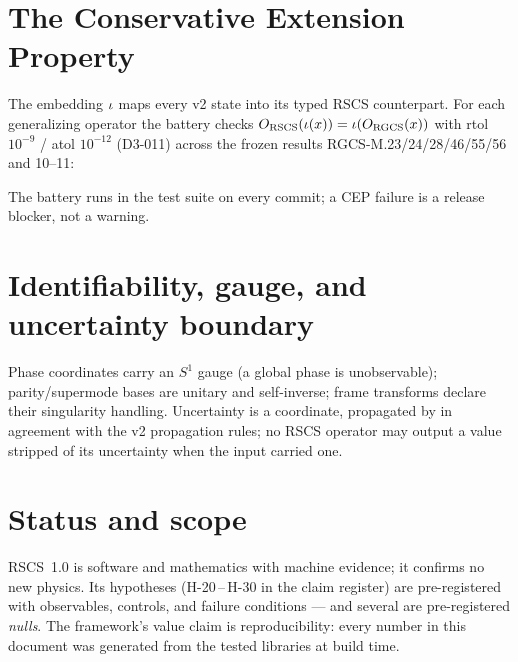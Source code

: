 \documentclass[10pt,letterpaper]{article}
\begin{document}
\section{The Conservative Extension Property}\label{sec:cep}
The embedding $\iota$ maps every v2 state into its typed RSCS
counterpart. For each generalizing operator the battery checks
$O_{\mathrm{RSCS}}(\iota(x)) = \iota(O_{\mathrm{RGCS}}(x))$ with
rtol $10^{-9}$ / atol $10^{-12}$ (D3-011) across the frozen results
RGCS-M.23/24/28/46/55/56 and 10--11:

The battery runs in the test suite on every commit; a CEP failure is a
release blocker, not a warning.

\section{Identifiability, gauge, and uncertainty boundary}
Phase coordinates carry an $S^1$ gauge (a global phase is unobservable);
parity/supermode bases  are unitary and self-inverse;
frame transforms  declare their singularity handling.
Uncertainty  is a coordinate, propagated by
 \DER{} in agreement with the v2 propagation rules; no
RSCS operator may output a value stripped of its uncertainty when the
input carried one.

\section{Status and scope}
RSCS~1.0 is software and mathematics with machine evidence; it confirms
no new physics. Its hypotheses (H-20\,--\,H-30 in the claim register) are
pre-registered with observables, controls, and failure conditions --- and
several are pre-registered \emph{nulls}. The framework's value claim is
reproducibility: every number in this document was generated from the
tested libraries at build time.



\end{document}
